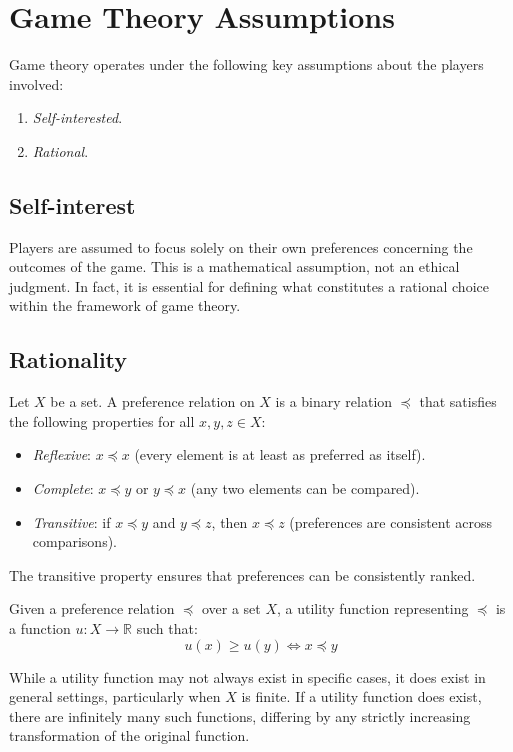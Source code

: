\section{Game Theory Assumptions}

Game theory operates under the following key assumptions about the players involved:
\begin{enumerate} 
    \item \textit{Self-interested}. 
    \item \textit{Rational}. 
\end{enumerate}

\subsection{Self-interest} 
Players are assumed to focus solely on their own preferences concerning the outcomes of the game. 
This is a mathematical assumption, not an ethical judgment. 
In fact, it is essential for defining what constitutes a rational choice within the framework of game theory.
  
\subsection{Rationality}
\begin{definition}
    Let $X$ be a set. 
    A preference relation on $X$ is a binary relation $\preceq$ that satisfies the following properties for all $x,y,z\in X$: 
    \begin{itemize}
        \item \textit{Reflexive}: $x\preceq x$ (every element is at least as preferred as itself).
        \item \textit{Complete}: $x \preceq y$ or $y \preceq x$  (any two elements can be compared).
        \item \textit{Transitive}: if $x \preceq y$ and $y \preceq z$, then $x \preceq z$ (preferences are consistent across comparisons).
    \end{itemize}
\end{definition}
The transitive property ensures that preferences can be consistently ranked.
\begin{definition}
    Given a preference relation $\preceq$ over a set $X$, a utility function representing $\preceq$ is a function $u:X\rightarrow\mathbb{R}$ such that: 
    \[u(x)\geq u(y)\Leftrightarrow x \preceq y\]
\end{definition}
While a utility function may not always exist in specific cases, it does exist in general settings, particularly when $X$ is finite.
If a utility function does exist, there are infinitely many such functions, differing by any strictly increasing transformation of the original function.

